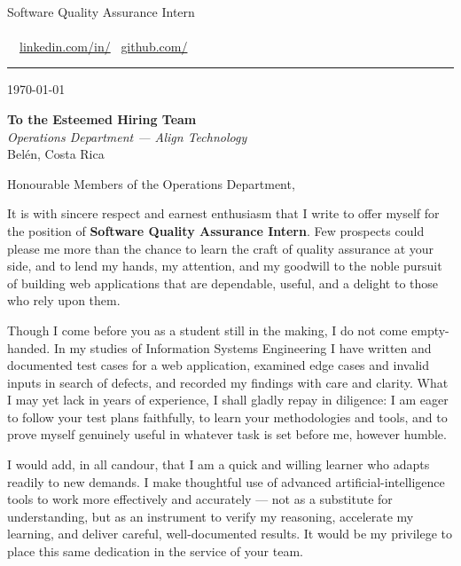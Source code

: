 \documentclass[11pt]{article}
\begin{document}
{\color{cvprimary}\Huge\bfseries \MyName}\\[2pt]
{\color{cvaccent}\large Software Quality Assurance Intern}\\[6pt]
{\small\color{cvlight}%
  \faMapMarker* \, \MyLocation \quad\textbullet\quad
  \faPhone* \, \MyPhone \\[2pt]
  \faEnvelope \, \href{mailto:\MyEmail}{\MyEmail} \quad\textbullet\quad
  \faLinkedin \, \href{\MyLinkedInURL}{linkedin.com/in/\MyLinkedIn} \quad\textbullet\quad
  \faGithub \, \href{\MyGitHubURL}{github.com/\MyGitHub}%
}\\[-2pt]
{\color{cvaccent}\rule{\linewidth}{1.2pt}}

\vspace{10pt}
{\color{cvlight}\small \today}

\vspace{8pt}
{\color{cvprimary}\bfseries To the Esteemed Hiring Team}\\
{\itshape Operations Department --- Align Technology}\\
{\color{cvlight}Belén, Costa Rica}

\vspace{12pt}
Honourable Members of the Operations Department,

\vspace{4pt}
It is with sincere respect and earnest enthusiasm that I write to offer myself for the
position of \textbf{Software Quality Assurance Intern}. Few prospects could please me more
than the chance to learn the craft of quality assurance at your side, and to lend my hands,
my attention, and my goodwill to the noble pursuit of building web applications that are
dependable, useful, and a delight to those who rely upon them.

Though I come before you as a student still in the making, I do not come empty-handed. In
my studies of Information Systems Engineering I have written and documented test cases for a
web application, examined edge cases and invalid inputs in search of defects, and recorded
my findings with care and clarity. What I may yet lack in years of experience, I shall
gladly repay in diligence: I am eager to follow your test plans faithfully, to learn your
methodologies and tools, and to prove myself genuinely useful in whatever task is set before
me, however humble.

I would add, in all candour, that I am a quick and willing learner who adapts readily to new
demands. I make thoughtful use of advanced artificial-intelligence tools to work more
effectively and accurately --- not as a substitute for understanding, but as an instrument
to verify my reasoning, accelerate my learning, and deliver careful, well-documented results.
It would be my privilege to place this same dedication in the service of your team.
\end{document}

